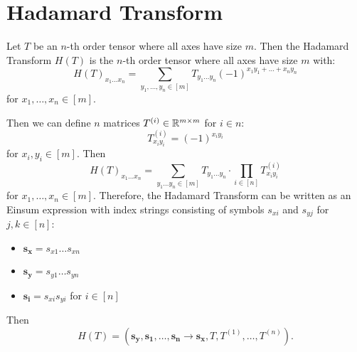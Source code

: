 \section{Hadamard Transform}
Let $T$ be an $n$-th order tensor where all axes have size $m$.
Then the Hadamard Transform $H(T)$ is the $n$-th order tensor where all axes have size $m$ with:
$$H(T)_{x_1 \dots x_n} = \sum\limits_{y_1, \dots, y_n \in [m]} T_{y_1 \dots y_n} (-1)^{x_1 y_1 + \ldots + x_n y_n}$$
for $x_1,\dots,x_n \in [m]$.

Then we can define $n$ matrices $T^{(i)} \in \mathbb{R}^{m \times m}$ for $i \in n$:
$$T^{(i)}_{x_i y_i} = (-1)^{x_i y_i}$$
for $x_i, y_i \in [m]$.
Then
$$H(T)_{x_1 \dots x_n} = \sum\limits_{y_1 \dots y_n \in [m]} T_{y_1 \dots y_n} \cdot \prod\limits_{i \in [n]} T^{(i)}_{x_i y_i}$$
for $x_1,\dots,x_n \in [m]$.
Therefore, the Hadamard Transform can be written as an Einsum expression with index strings consisting of symbols $s_{xi}$ and $s_{yj}$ for $j,k \in [n]$:
\begin{itemize}
    \item $\bm{s_x} = s_{x1}\dots s_{x n}$
    \item $\bm{s_y} = s_{y1}\dots s_{y n}$
    \item $\bm{s_i} = s_{xi} s_{yi}$ for $i \in [n]$
\end{itemize}
Then
$$H(T) = (\bm{s_y}, \bm{s_1}, \dots, \bm{s_n} \rightarrow \bm{s_x}, T, T^{(1)}, \dots, T^{(n)}).$$